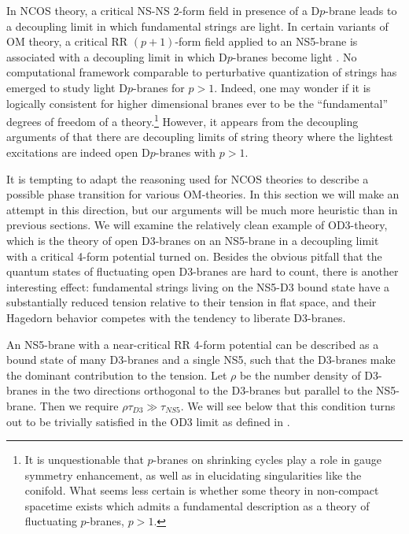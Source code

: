 In NCOS theory, a critical NS-NS 2-form field in presence of a
D$p$-brane leads to a decoupling limit in which fundamental strings
are light.  In certain variants of OM theory, a critical RR
$(p+1)$-form field applied to an NS5-brane is associated with a
decoupling limit in which D$p$-branes become light
\cite{GMSS,HarmarkTwo}.  No computational framework comparable to
perturbative quantization of strings has emerged to study light
D$p$-branes for $p>1$.  Indeed, one may wonder if it is logically
consistent for higher dimensional branes ever to be the
``fundamental'' degrees of freedom of a theory.\footnote{It is
unquestionable that $p$-branes on shrinking cycles play a role in
gauge symmetry enhancement, as well as in elucidating singularities
like the conifold.  What seems less certain is whether some theory in
non-compact spacetime exists which admits a fundamental description as
a theory of fluctuating $p$-branes, $p>1$.}  However, it appears from
the decoupling arguments of \cite{GMSS,HarmarkTwo} that there are
decoupling limits of string theory where the lightest excitations are
indeed open D$p$-branes with $p>1$.

It is tempting to adapt the reasoning used for NCOS theories to
describe a possible phase transition for various OM-theories.  In this
section we will make an attempt in this direction, but our arguments
will be much more heuristic than in previous sections.  We will
examine the relatively clean example of OD3-theory, which is the
theory of open D3-branes on an NS5-brane in a decoupling limit with a
critical 4-form potential turned on.  Besides the obvious
pitfall that the quantum states of fluctuating open D3-branes are hard
to count, there is another interesting effect: fundamental strings
living on the NS5-D3 bound state have a substantially reduced tension
relative to their tension in flat space, 
and their Hagedorn behavior competes with the tendency to liberate
D3-branes.

An NS5-brane with a near-critical RR 4-form potential can be
described as a bound state of many D3-branes and a single NS5, such
that the D3-branes make the dominant contribution to the tension.  Let
$\rho$ be the number density of D3-branes in the two directions
orthogonal to the D3-branes but parallel to the NS5-brane.  Then we
require $\rho \tau_{D3} \gg \tau_{NS5}$.  We will see below that this
condition turns out to be trivially satisfied in the OD3 limit as
defined in \cite{GMSS}.


